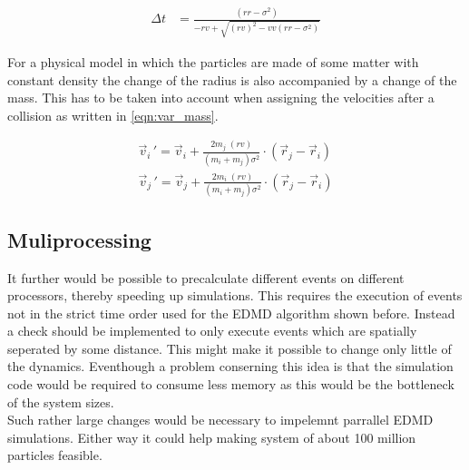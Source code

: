 \begin{align}
\label{eqn:collision_prediction}
\Delta t &= \frac{(rr - \sigma^2 )}{ - rv + \sqrt{ (rv)^2  - vv (rr - \sigma^2 )}}
\end{align} 

For a physical model in which the particles are made of some matter with constant density the change of the radius is also accompanied by a change of the mass. This has to be taken into account when assigning the velocities after a collision as written in \autoref{eqn:var_mass}.

\begin{align}
\label{eqn:var_mass}
\vec{v}_i{\,'} = \vec{v}_i + \frac{2 m_j \; (rv)}{(m_i + m_j) \sigma^2} \cdot (\vec{r}_j - \vec{r}_i) \nonumber \\
\vec{v}_j{\,'} = \vec{v}_j + \frac{2 m_i \; (rv)}{(m_i + m_j) \sigma^2} \cdot (\vec{r}_j - \vec{r}_i)
\end{align}


\subsection{Muliprocessing}
\label{sec:extension_MP}
It further would be possible to precalculate different events on different processors, thereby speeding up simulations. This requires the execution of events not in the strict time order used for the EDMD algorithm shown before. Instead a check should be implemented to only execute events which are spatially seperated by some distance. This might make it possible to change only little of the dynamics. Eventhough a problem conserning this idea is that the simulation code would be required to consume less memory as this would be the bottleneck of the system sizes.\\
Such rather large changes would be necessary to impelemnt parrallel EDMD simulations. Either way it could help making system of about 100 million particles feasible.   


